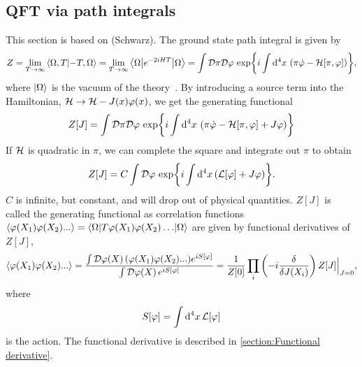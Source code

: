 \label{Effective potential}
\subsection{QFT via path integrals}
This section is based on \cite{Peskin:IntroQFT,weinberg_1995,weinberg_1996_vol2} (Schwarz).
The ground state path integral is given by
\begin{equation}
    Z = \lim_{T\rightarrow \infty} \braket{\Omega, T}{-T, \Omega}
    = \lim_{T\rightarrow \infty} \left\langle \Omega {\left|  e^{-2iHT}  \right|} \Omega \right\rangle
    = \int \mathcal{D} \pi \mathcal{D} \varphi \, \exp{ i \int \dd^4 x \, \left(\pi \dot \varphi - \mathcal{H}[\pi, \varphi]\right) },
\end{equation}
where $\ket{\Omega}$ is the vacuum of the theory~\cite{Peskin:IntroQFT,weinberg_1995}.
By introducing a source term into the Hamiltonian, $\mathcal{H} \rightarrow \mathcal{H} - J(x)\varphi(x)$, we get the generating functional
\begin{equation}
    Z[J] = 
    \int \mathcal{D} \pi \mathcal{D} \varphi \, 
    \exp{ i \int \dd^4 x \, \left(\pi \dot \varphi - \mathcal{H}[\pi, \varphi]+ J\varphi\right) }
\end{equation}
If $\mathcal{H}$ is quadratic in $\pi$, we can complete the square and integrate out $\pi$ to obtain
\begin{equation}
    Z[J] = C \int \mathcal{D} \varphi \, \exp{i \int \dd^4 x\, (\mathcal{L}[\varphi] + J \varphi)}.
\end{equation}
$C$ is infinite, but constant, and will drop out of physical quantities.
$Z[J]$ is called the generating functional as correlation functions $\ex{\varphi(X_1)\varphi(X_2)...} = \inner{\Omega}{T{\varphi(X_1)\varphi(X_2)\dots}}{\Omega}$ are given by functional derivatives of $Z[J]$, 
\begin{equation}
    \label{correlator from generating functional}
    \ex{\varphi(X_1)\varphi(X_2)...}
    = 
    \frac{\int \D \varphi(X)\,  (\varphi(X_1)\varphi(X_2)...) e^{i S[\varphi]}}
        {\int \D \varphi(X)\, e^{i S[\varphi]}}
    =
    \frac{1}{Z[0]} \prod_i\left( -i  \fdv{J(X_i)}\right) Z[J]\Big|_{J = 0},
\end{equation}
where 
\begin{equation}
    S[\varphi] = \int \dd^4 x \, \mathcal{L}[\varphi]
\end{equation}
is the action.
The functional derivative is described in \autoref{section:Functional derivative}.


